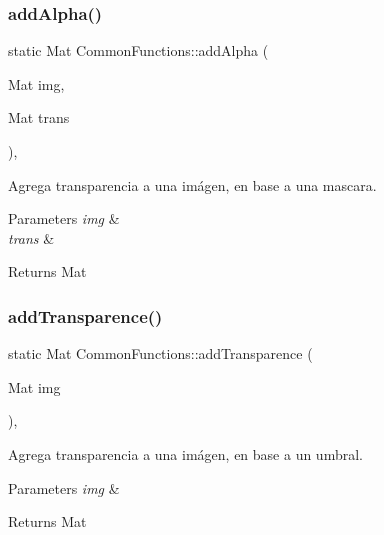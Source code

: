 \subsubsection{\texorpdfstring{add\+Alpha()}{addAlpha()}}
{\footnotesize\ttfamily static Mat Common\+Functions\+::add\+Alpha (\begin{DoxyParamCaption}\item[{Mat}]{img,  }\item[{Mat}]{trans }\end{DoxyParamCaption})\hspace{0.3cm}{\ttfamily [inline]}, {\ttfamily [static]}}



Agrega transparencia a una imágen, en base a una mascara. 


\begin{DoxyParams}{Parameters}
{\em img} & \\
\hline
{\em trans} & \\
\hline
\end{DoxyParams}
\begin{DoxyReturn}{Returns}
Mat 
\end{DoxyReturn}
\mbox{\label{classCommonFunctions_a66c8badc3cb8d173aaac77a3acdbec4c}} 
\subsubsection{\texorpdfstring{add\+Transparence()}{addTransparence()}}
{\footnotesize\ttfamily static Mat Common\+Functions\+::add\+Transparence (\begin{DoxyParamCaption}\item[{Mat}]{img }\end{DoxyParamCaption})\hspace{0.3cm}{\ttfamily [inline]}, {\ttfamily [static]}}



Agrega transparencia a una imágen, en base a un umbral. 


\begin{DoxyParams}{Parameters}
{\em img} & \\
\hline
\end{DoxyParams}
\begin{DoxyReturn}{Returns}
Mat 
\end{DoxyReturn}
\mbox{\label{classCommonFunctions_a4a2a24e283f18beb6e217993924759c6}} 
